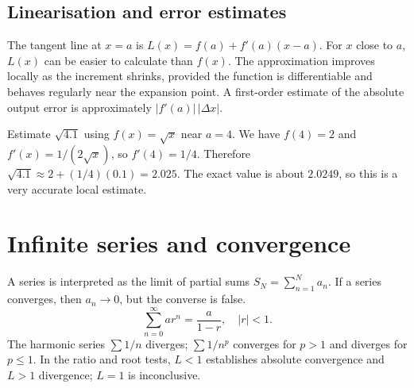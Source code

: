 \documentclass[12pt,a4paper]{article}
\begin{document}
\subsection{Linearisation and error estimates}
The tangent line at $x=a$ is $L(x)=f(a)+f'(a)(x-a)$. For $x$ close to $a$, $L(x)$ can be easier to calculate than $f(x)$. The approximation improves locally as the increment shrinks, provided the function is differentiable and behaves regularly near the expansion point. A first-order estimate of the absolute output error is approximately $|f'(a)|\,|\Delta x|$.

\begin{exampleBox}Estimate $\sqrt{4.1}$ using $f(x)=\sqrt{x}$ near $a=4$. We have $f(4)=2$ and $f'(x)=1/(2\sqrt{x})$, so $f'(4)=1/4$. Therefore $\sqrt{4.1}\approx2+(1/4)(0.1)=2.025$. The exact value is about $2.0249$, so this is a very accurate local estimate.
\end{exampleBox}

\section{Infinite series and convergence}
A series is interpreted as the limit of partial sums $S_N=\sum_{n=1}^N a_n$. If a series converges, then $a_n\to0$, but the converse is false.
\[
\sum_{n=0}^{\infty} ar^n=\frac{a}{1-r},\quad |r|<1.
\]
The harmonic series $\sum 1/n$ diverges; $\sum 1/n^p$ converges for $p>1$ and diverges for $p\le1$. In the ratio and root tests, $L<1$ establishes absolute convergence and $L>1$ divergence; $L=1$ is inconclusive.
\begin{center}
\end{center}
\end{document}
